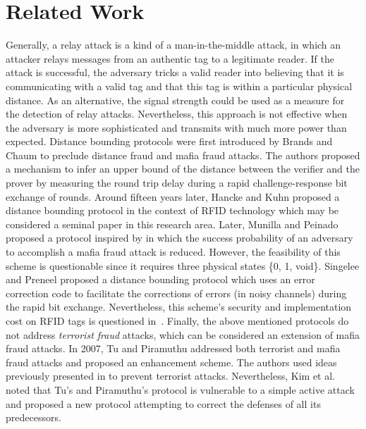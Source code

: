 \documentclass{article}
\begin{document}
\section{Related Work}
Generally, a relay attack is a kind of a man-in-the-middle attack, in which an attacker relays messages from an authentic tag to a legitimate reader. If the attack is successful, the adversary tricks a valid reader into believing that it is communicating with a valid tag and that this tag is within a particular physical distance. As an alternative, the signal strength could be used as a measure for the detection of relay attacks. Nevertheless, this approach is not effective when the adversary is more sophisticated and transmits with much more power than expected. Distance bounding protocols were  first introduced by Brands and Chaum \cite{brands94} to preclude distance fraud and mafia fraud attacks. The authors proposed a mechanism to infer an upper bound of the distance between the verifier and the prover by measuring the round trip delay during a rapid challenge-response bit exchange of  rounds.  Around fifteen years later, Hancke and Kuhn \cite{hancke05} proposed a distance bounding protocol in the context of RFID technology which may be considered a seminal paper in this research area. Later, Munilla and Peinado \cite{munilla2} proposed a protocol inspired by \cite{hancke05} in which the success probability of an adversary to accomplish a mafia fraud attack is reduced. However, the feasibility of this scheme is questionable since it requires three physical states \{0, 1, void\}.  Singelee and Preneel \cite{singeleep07} proposed a distance bounding protocol which uses an error correction code to facilitate the corrections of errors (in noisy channels) during the rapid bit exchange. Nevertheless, this scheme's security and implementation cost on RFID tags is questioned in~\cite{MunillaP-2010-elseviercc}. Finally, the above mentioned protocols do not address {\em terrorist fraud} attacks, which can be considered an extension of mafia fraud attacks.  In 2007, Tu and Piramuthu \cite{TuP-2007-rfidtechnology} addressed both terrorist and mafia fraud attacks and proposed an enhancement scheme. The authors used ideas previously presented in \cite{reid2007} to prevent terrorist attacks.  Nevertheless, Kim et al. \cite{KimAKSP-2008-icisc} noted that Tu's and Piramuthu's protocol is vulnerable to a simple active attack and proposed a new protocol attempting to correct the defenses of all its predecessors.\\
\end{document}

